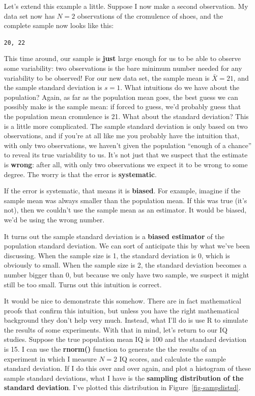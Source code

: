 \documentclass[
  letterpaper,
  DIV=11,
  numbers=noendperiod]{scrreprt}
\begin{document}
Let's extend this example a little. Suppose I now make a second
observation. My data set now has \(N=2\) observations of the cromulence
of shoes, and the complete sample now looks like this:

\texttt{20,\ 22}

This time around, our sample is \textbf{just} large enough for us to be
able to observe some variability: two observations is the bare minimum
number needed for any variability to be observed! For our new data set,
the sample mean is \(\bar{X}=21\), and the sample standard deviation is
\(s=1\). What intuitions do we have about the population? Again, as far
as the population mean goes, the best guess we can possibly make is the
sample mean: if forced to guess, we'd probably guess that the population
mean cromulence is 21. What about the standard deviation? This is a
little more complicated. The sample standard deviation is only based on
two observations, and if you're at all like me you probably have the
intuition that, with only two observations, we haven't given the
population ``enough of a chance'' to reveal its true variability to us.
It's not just that we suspect that the estimate is \textbf{wrong}: after
all, with only two observations we expect it to be wrong to some degree.
The worry is that the error is \textbf{systematic}.

If the error is systematic, that means it is \textbf{biased}. For
example, imagine if the sample mean was always smaller than the
population mean. If this was true (it's not), then we couldn't use the
sample mean as an estimator. It would be biased, we'd be using the wrong
number.

It turns out the sample standard deviation is a \textbf{biased
estimator} of the population standard deviation. We can sort of
anticipate this by what we've been discussing. When the sample size is
1, the standard deviation is 0, which is obviously to small. When the
sample size is 2, the standard deviation becomes a number bigger than 0,
but because we only have two sample, we suspect it might still be too
small. Turns out this intuition is correct.

It would be nice to demonstrate this somehow. There are in fact
mathematical proofs that confirm this intuition, but unless you have the
right mathematical background they don't help very much. Instead, what
I'll do is use R to simulate the results of some experiments. With that
in mind, let's return to our IQ studies. Suppose the true population
mean IQ is 100 and the standard deviation is 15. I can use the
\textbf{rnorm()} function to generate the the results of an experiment
in which I measure \(N=2\) IQ scores, and calculate the sample standard
deviation. If I do this over and over again, and plot a histogram of
these sample standard deviations, what I have is the \textbf{sampling
distribution of the standard deviation}. I've plotted this distribution
in Figure~\ref{fig-sampdistsd}.
\end{document}
